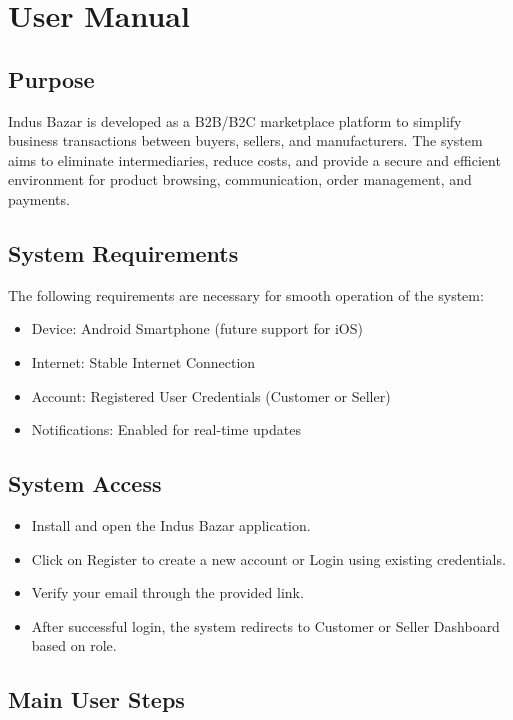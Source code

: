 \chapter{User Manual} \label{ap:Appendix1}

\section{Purpose}

Indus Bazar is developed as a B2B/B2C marketplace platform to simplify business transactions between buyers, sellers, and manufacturers. The system aims to eliminate intermediaries, reduce costs, and provide a secure and efficient environment for product browsing, communication, order management, and payments.

\section{System Requirements}

The following requirements are necessary for smooth operation of the system:

\begin{itemize}
    \item Device: Android Smartphone (future support for iOS)
    \item Internet: Stable Internet Connection
    \item Account: Registered User Credentials (Customer or Seller)
    \item Notifications: Enabled for real-time updates
\end{itemize}

\section{System Access}

\begin{itemize}
    \item Install and open the Indus Bazar application.
    \item Click on Register to create a new account or Login using existing credentials.
    \item Verify your email through the provided link.
    \item After successful login, the system redirects to Customer or Seller Dashboard based on role.
\end{itemize}

\section{Main User Steps}


